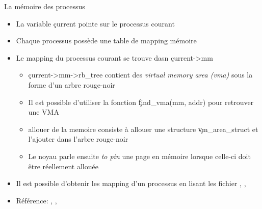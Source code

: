 \begin{frame}[fragile=singleslide]{La mémoire des processus}
  \begin{itemize} 
  \item La variable \c{current} pointe sur le processus courant
  \item Chaque processus possède une table de mapping mémoire
  \item Le mapping du processus courant se trouve dasn \c{current->mm}
    \begin{itemize} 
    \item  \c{current->mm->rb_tree} contient des  \emph{virtual memory
        area (vma)} sous la forme d'un arbre rouge-noir
    \item     Il    est     possible     d'utiliser    la     fonction
      \c{find_vma(mm, addr)} pour retrouver une VMA
    \item  allouer de  la  memoire consiste  à  allouer une  structure
      \c{vm_area_struct} et l'ajouter dans l'arbre rouge-noir
    \item Le  noyau parle  ensuite \emph{to pin}  une page  en mémoire
      lorsque celle-ci doit être réellement allouée
    \end{itemize} 
  \item Il est possible d'obtenir les mapping d'un processus en lisant
    les   fichier   ,   ,
  \item         Référence:        ,
    , 
  \end{itemize} 
\end{frame} 

